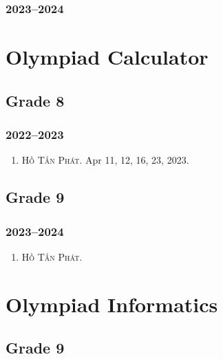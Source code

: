 \documentclass{article}
\begin{document}
\subsubsection{2023--2024}


\section{Olympiad Calculator}

\subsection{Grade 8}

\subsubsection{2022--2023}

\begin{enumerate}
	\item \textsc{Hồ Tấn Phát.} {\sf[In]} Apr 11, 12, 16, 23, 2023.
\end{enumerate}


\subsection{Grade 9}

\subsubsection{2023--2024}

\begin{enumerate}
	\item \textsc{Hồ Tấn Phát.}
\end{enumerate}


\section{Olympiad Informatics}

\subsection{Grade 9}
\end{document}
